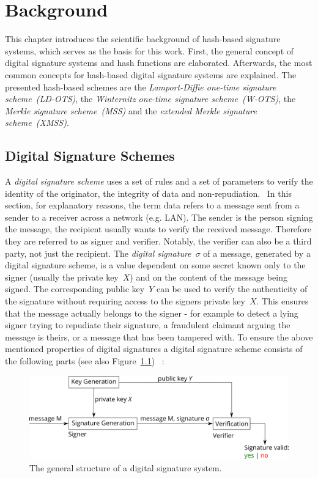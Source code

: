 \chapter{Background}
\label{cha:background}
This chapter introduces the scientific background of hash-based signature systems, which serves as the basis for this work.
First, the general concept of digital signature systems and hash functions are elaborated. Afterwards, the most common concepts for hash-based digital signature systems are explained. The presented hash-based schemes are the \textit{Lamport-Diffie one-time signature scheme~(LD-OTS)}, the \textit{Winternitz one-time signature scheme~(W-OTS)}, the \textit{Merkle signature scheme~(MSS)} and the \textit{extended Merkle signature scheme~(XMSS)}.

\section{Digital Signature Schemes}
\label{sec:dig_sign_schemes}
A \textit{digital signature scheme} uses a set of rules and a set of parameters to verify the identity of the originator, the integrity of data and non-repudiation.~\cite{cha:bg_digital_sign_schemes_NIST_standard1992} 
In this section, for explanatory reasons, the term data refers to a message sent from a sender to a receiver across a network (e.g. LAN). 
The sender is the person signing the message, the recipient usually wants to verify the received message. Therefore they are referred to as signer and verifier. Notably, the verifier can also be a third party, not just the recipient.
The \textit{digital signature~$\sigma$} of a message, generated by a digital signature scheme, is a value dependent on some secret known only to the signer (usually the private key~$X$) and on the content of the message being signed.
The corresponding public key~$Y$ can be used to verify the authenticity of the signature without requiring access to the signers private key~$X$.
This ensures that the message actually belongs to the signer - for example to detect a lying signer trying to repudiate their signature, a fraudulent claimant arguing the message is theirs, or a message that has been tampered with.
To ensure the above mentioned properties of digital signatures a digital signature scheme consists of the following parts (see also Figure~\ref{img:digital_sign_system_simple})~\cite{cha:bg_signature_schemes_book_menezes2018_1997} :

\begin{figure}
\centering
\includegraphics[width=\linewidth]{images/Background/Digital_Signaturesystem_Simple.png}
\caption{The general structure of a digital signature system.}
\label{img:digital_sign_system_simple}
\end{figure} 

